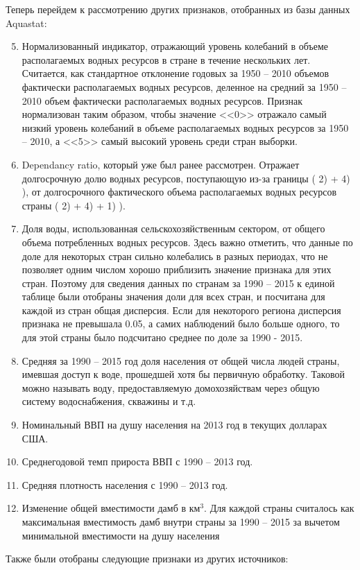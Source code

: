 \documentclass[a4paper, 12pt]{article}
\theoremstyle{plain} %
\theoremstyle{definition} %
\theoremstyle{remark} %
\begin{document}
Теперь перейдем к рассмотрению других признаков, отобранных из базы данных Aquastat:
\begin{enumerate}
	\setcounter{enumi}{4}
	\item Нормализованный индикатор, отражающий уровень колебаний в объеме располагаемых водных ресурсов в стране в течение нескольких лет. Считается, как стандартное отклонение годовых за 1950 – 2010 объемов фактически располагаемых водных ресурсов, деленное на средний за 1950 – 2010 объем фактически располагаемых водных ресурсов. Признак нормализован таким образом, чтобы значение <<0>> отражало самый низкий уровень колебаний в объеме располагаемых водных ресурсов за 1950 – 2010, а <<5>> самый высокий уровень среди стран выборки.
	\item Dependancy ratio, который уже был ранее рассмотрен. Отражает долгосрочную долю водных ресурсов, поступающую из-за границы ( 2) + 4) ), от долгосрочного фактического объема располагаемых водных ресурсов страны ( 2) + 4) + 1) ).
	\item Доля воды, использованная сельскохозяйственным сектором, от общего объема потребленных водных ресурсов. Здесь важно отметить, что данные по доле для некоторых стран сильно колебались в разных периодах, что не позволяет одним числом хорошо приблизить значение признака для этих стран. Поэтому для сведения данных по странам за 1990 – 2015 к единой таблице были отобраны значения доли для всех стран, и посчитана для каждой из стран общая дисперсия. Если для некоторого региона дисперсия признака не превышала 0.05, а самих наблюдений было больше одного, то для этой страны было подсчитано среднее по доле за 1990 - 2015.
	\item Средняя за 1990 – 2015 год доля населения от общей числа людей страны, имевшая доступ к воде, прошедшей хотя бы первичную обработку. Таковой можно называть воду, предоставляемую домохозяйствам через общую систему водоснабжения, скважины и т.д.
	\item Номинальный ВВП на душу населения на 2013 год в текущих долларах США.
	\item Среднегодовой темп прироста ВВП с 1990 – 2013 год.
	\item Средняя плотность населения с 1990 – 2013 год.
	\item Изменение общей вместимости дамб в $\text{км}^3$. Для каждой страны считалось как максимальная вместимость дамб внутри страны за 1990 – 2015 за вычетом минимальной вместимости на душу населения
\end{enumerate}
Также были отобраны следующие признаки из других источников:
\end{document}
